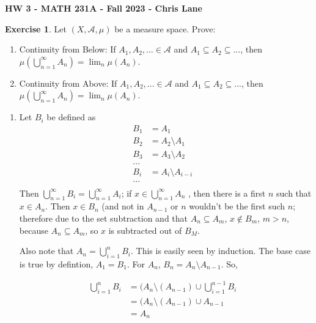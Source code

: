 \documentclass[11pt,oneside]{article}
\numberwithin{equation}{section}
\theoremstyle{definition}
\newtheorem{exercise}{Exercise}
\begin{document}
\textbf{HW 3 - MATH 231A - Fall 2023 - Chris Lane}

\begin{exercise}
  Let $(X, \mathcal{A}, \mu)$ be a measure space.  Prove:
  \begin{enumerate}
  \item
    Continuity from Below: If $A_1, A_2, ... \in \mathcal{A}$ and $A_1 \subseteq A_2 \subseteq ...$, then
    $\mu ( \bigcup \limits _{n=1} ^\infty A_n ) = \lim _n  \mu ( A_n)$.
  \item
    Continuity from Above: If $A_1, A_2, ... \in \mathcal{A}$ and $A_1 \subseteq A_2 \subseteq ...$, then
    $\mu ( \bigcup \limits _{n=1} ^\infty A_n ) = \lim _n \mu(A_n)$.
  \end{enumerate}
\end{exercise}
\begin{solution}
  \begin{enumerate}
  \item
    Let $B_i$ be defined as
    \begin{align*}
      B_1 &= A_1 & \\
      B_2 &= A_2 \setminus A_1 & \\
      B_3 &= A_3 \setminus A_2 & \\
      ...\\
      B_i & = A_i \setminus A_{i-i} & \\
      ...\\
    \end{align*}
    Then $\bigcup \limits _{n=1} ^ \infty B_i = \bigcup \limits _{n=1}
    ^ \infty A_i$; if $x \in \bigcup \limits _ {n=1} ^ \infty A_n$ ,
    then there is a first $n$ such that $x \in A_n$.  Then $x \in B_n$
    (and not in $A_{n-1}$ or $n$ wouldn't be the first such $n$;
    therefore due to the set subtraction and that $A_n \subseteq A_m$,
    $x \notin B_m$, $m > n$, because $A_n \subseteq A_m$, so $x$ is subtracted out of $B_M$.

    Also note that $A_n = \bigcup \limits _ {i = 1}^n B_i$.  This is
    easily seen by induction.  The base case is true by defintion,
    $A_1 = B_1$.  For $A_n$, $B_n = A_n \setminus A_{n-1}$.  So,

    \begin{align*} 
      \bigcup \limits _ {i=1}^n B_i &= ( A_n \setminus ( A_{n-1} ) \cup \bigcup \limits _ {i=1} ^ {n-1} B_i &\\
       &= ( A_n \setminus ( A_{n-1} ) \cup A_{n-1} & \\
       &= A_n \\
    \end{align*}


\end{enumerate}
\end{solution}
\end{document}

